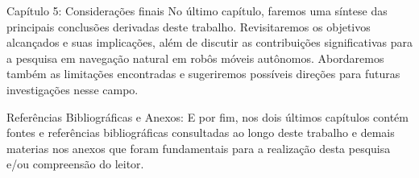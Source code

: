 Capítulo 5: Considerações finais
No último capítulo, faremos uma síntese das principais conclusões derivadas deste trabalho. Revisitaremos os objetivos alcançados e suas implicações, além de discutir as contribuições significativas para a pesquisa em navegação natural em robôs móveis autônomos. Abordaremos também as limitações encontradas e sugeriremos possíveis direções para futuras investigações nesse campo.

Referências Bibliográficas e Anexos:
E por fim, nos dois últimos capítulos contém fontes e referências bibliográficas consultadas ao longo deste trabalho e demais materias nos anexos que foram fundamentais para a realização desta pesquisa e/ou compreensão do leitor. 
